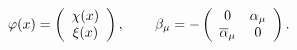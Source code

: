 \begin{equation}
\varphi (x)=\left(
\begin{array}{c}
\chi (x) \\
\xi (x)
\end{array}
\right) ,\hspace{0.3in}\beta _\mu =-\left(
\begin{array}{cc}
0 & \alpha _\mu \\
\overline{\alpha }_\mu & 0
\end{array}
\right) . \label{31}
\end{equation}


